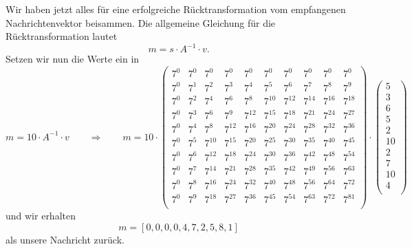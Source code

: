 Wir haben jetzt alles für eine erfolgreiche Rücktransformation vom empfangenen Nachrichtenvektor beisammen. Die allgemeine Gleichung für die Rücktransformation lautet
\[
m = s \cdot A^{-1} \cdot v.
\]
Setzen wir nun die Werte ein in
%
\[
m = 10 \cdot A^{-1} \cdot v \qquad \Rightarrow \qquad m = 10 \cdot \begin{pmatrix}
	7^0&    7^0&    7^0&    7^0&    7^0&    7^0&    7^0&    7^0&    7^0&    7^0\\
	7^0&	7^1&	7^2&	7^3&	7^4&	7^5&	7^6&	7^7&    7^8&	7^9\\
	7^0&	7^2&	7^4&	7^6&	7^8& 7^{10}& 7^{12}& 7^{14}& 7^{16}& 7^{18}\\
	7^0&	7^3&	7^6&	7^9& 7^{12}& 7^{15}& 7^{18}& 7^{21}& 7^{24}& 7^{27}\\
	7^0&	7^4&	7^8& 7^{12}& 7^{16}& 7^{20}& 7^{24}& 7^{28}& 7^{32}& 7^{36}\\
	7^0&	7^5& 7^{10}& 7^{15}& 7^{20}& 7^{25}& 7^{30}& 7^{35}& 7^{40}& 7^{45}\\
	7^0&	7^6& 7^{12}& 7^{18}& 7^{24}& 7^{30}& 7^{36}& 7^{42}& 7^{48}& 7^{54}\\
	7^0&	7^7& 7^{14}& 7^{21}& 7^{28}& 7^{35}& 7^{42}& 7^{49}& 7^{56}& 7^{63}\\
	7^0&	7^8& 7^{16}& 7^{24}& 7^{32}& 7^{40}& 7^{48}& 7^{56}& 7^{64}& 7^{72}\\
	7^0&	7^9& 7^{18}& 7^{27}& 7^{36}& 7^{45}& 7^{54}& 7^{63}& 7^{72}& 7^{81}\\
\end{pmatrix}
\cdot
\begin{pmatrix}
	5 \\ 3 \\ 6 \\ 5 \\ 2 \\ 10 \\ 2 \\ 7 \\ 10 \\ 4 \\
\end{pmatrix}
\]
und wir erhalten
\[
m = [0,0,0,0,4,7,2,5,8,1]
\]
als unsere Nachricht zurück.